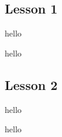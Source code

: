 \documentclass[fleqn, twoside]{article}
\begin{document}
\newpage
\pagestyle{branded}
\subsection{Lesson 1}

\begin{examplebox}{}{}
	hello	
\end{examplebox}
\begin{examplebox}{}{}
	hello	
\end{examplebox}


\subsection{Lesson 2}
\begin{examplebox}{}{}
	hello	
\end{examplebox}

\begin{examplebox}{}{}
	hello
\end{examplebox}


\exercise{}


\newpage

\lipsum[2-30]
\end{document}
